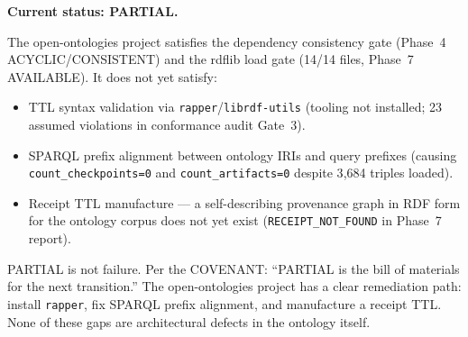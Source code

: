 \textbf{Current status: PARTIAL.}

The open-ontologies project satisfies the dependency consistency gate (Phase~4 ACYCLIC/CONSISTENT)
and the rdflib load gate (14/14 files, Phase~7 AVAILABLE). It does not yet satisfy:
\begin{itemize}
  \item TTL syntax validation via \texttt{rapper}/\texttt{librdf-utils} (tooling not installed;
        23 assumed violations in conformance audit Gate~3).
  \item SPARQL prefix alignment between ontology IRIs and query prefixes (causing
        \texttt{count\_checkpoints=0} and \texttt{count\_artifacts=0} despite 3{,}684 triples
        loaded).
  \item Receipt TTL manufacture --- a self-describing provenance graph in RDF form for the
        ontology corpus does not yet exist (\texttt{RECEIPT\_NOT\_FOUND} in Phase~7 report).
\end{itemize}

PARTIAL is not failure. Per the COVENANT: ``PARTIAL is the bill of materials for the next
transition.'' The open-ontologies project has a clear remediation path: install \texttt{rapper},
fix SPARQL prefix alignment, and manufacture a receipt TTL. None of these gaps are
architectural defects in the ontology itself.
